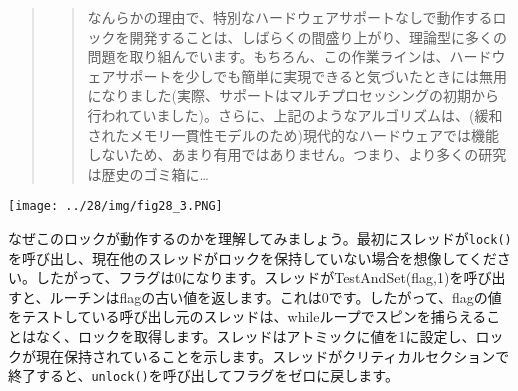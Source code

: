\begin{Shaded}
\begin{Highlighting}[]
\NormalTok{ flag[}\NormalTok{];}

\NormalTok{    flag[}\NormalTok{] = flag[}\NormalTok{] = }\NormalTok{; }
\NormalTok{; }
\NormalTok{\}}
\NormalTok{; }
    \NormalTok{ ((flag[}\NormalTok{{-}self] == }
\NormalTok{        ; }
\NormalTok{\}}
\NormalTok{; }
\NormalTok{\}}
\end{Highlighting}
\end{Shaded}

\begin{quote}
\begin{quote}
なんらかの理由で、特別なハードウェアサポートなしで動作するロックを開発することは、しばらくの間盛り上がり、理論型に多くの問題を取り組んでいます。もちろん、この作業ラインは、ハードウェアサポートを少しでも簡単に実現できると気づいたときには無用になりました(実際、サポートはマルチプロセッシングの初期から行われていました)。さらに、上記のようなアルゴリズムは、(緩和されたメモリ一貫性モデルのため)現代的なハードウェアでは機能しないため、あまり有用ではありません。つまり、より多くの研究は歴史のゴミ箱に\ldots{}
\end{quote}
\end{quote}

\texttt{[image: ../28/img/fig28\_3.PNG]}

なぜこのロックが動作するのかを理解してみましょう。最初にスレッドが\texttt{lock()}を呼び出し、現在他のスレッドがロックを保持していない場合を想像してください。したがって、フラグは0になります。スレッドがTestAndSet(flag,1)を呼び出すと、ルーチンはflagの古い値を返します。これは0です。したがって、flagの値をテストしている呼び出し元のスレッドは、whileループでスピンを捕らえることはなく、ロックを取得します。スレッドはアトミックに値を1に設定し、ロックが現在保持されていることを示します。スレッドがクリティカルセクションで終了すると、\texttt{unlock()}を呼び出してフラグをゼロに戻します。

